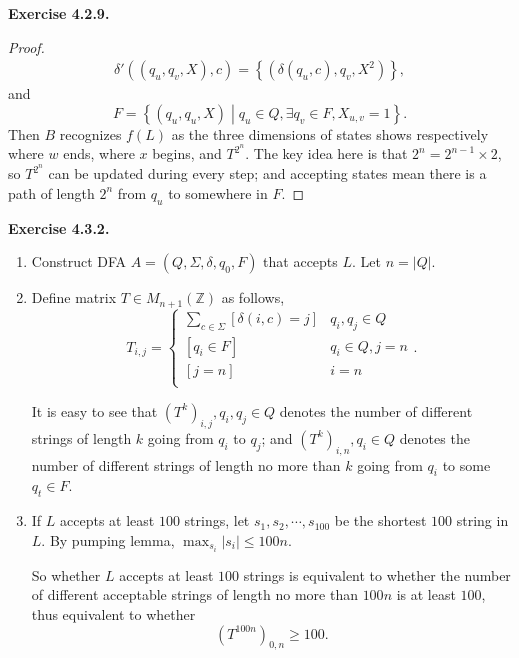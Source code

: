 \documentclass[a4paper]{article}
\newtheorem*{proof}{Proof}
\newenvironment{exercise}[1]{
	\par
	\noindent\textbf{Exercise #1.}\quad
}{
	\par
	\bigskip
}
\newcommand{\Zset}{\mathbb{Z}}
\begin{document}
\begin{exercise}{4.2.9}
\begin{proof}
\begin{gather*}
            \delta'\left((q_u,q_v,X),c\right)=\left\{\left(\delta(q_u,c),q_v,X^2\right)\right\},
        \end{gather*}
        and 
        $$
        F=\left\{(q_u,q_u,X)\middle|q_u\in Q,\exists q_v\in F,X_{u,v}=1\right\}.
        $$
        Then $B$ recognizes $f(L)$ as the three dimensions of states shows respectively
        where $w$ ends, where $x$ begins, and $T^{2^n}$. The key idea here is 
        that $2^n=2^{n-1}\times 2$, so $T^{2^n}$ can be updated during every step;
        and accepting states mean there is a path of length $2^n$ from $q_u$ to somewhere in
        $F$.
    \end{proof}
\end{exercise}

\begin{exercise}{4.3.2}\hspace{0pt}\\
    \begin{enumerate}
        \item Construct DFA $A=(Q,\Sigma,\delta,q_0,F)$ that accepts $L$. Let $n=|Q|$.
        \item Define matrix $T\in M_{n+1}(\Zset)$ as follows,
            $$
            T_{i,j}=\begin{cases}
                \sum_{c\in\Sigma} [\delta(i,c)=j] & q_i,q_j\in Q\\
                [q_i\in F] & q_i\in Q, j=n\\ 
                [j=n] & i=n\\ 
            \end{cases}.
            $$\par
            It is easy to see that $(T^k)_{i,j},q_i,q_j\in Q$ denotes the number of different
            strings of length $k$ going from $q_i$ to $q_j$;
            and $(T^k)_{i,n},q_i\in Q$ denotes
            the number of different strings of length no more than $k$ going from $q_i$ to
            some $q_t\in F$.
        \item If $L$ accepts at least $100$ strings, let $s_1,s_2,\cdots,s_{100}$ be the 
            shortest $100$ string in $L$. By pumping lemma, $\max_{s_i} |s_i|\leqslant 100n$.\par
            So whether $L$ accepts at least $100$ strings is equivalent to whether 
            the number of different acceptable
            strings of length no more than $100n$ is at least
            $100$, thus equivalent to whether 
            $$
            \left(T^{100n}\right)_{0,n}\geqslant 100.
            $$
    \end{enumerate}
\end{exercise}
\end{document}
